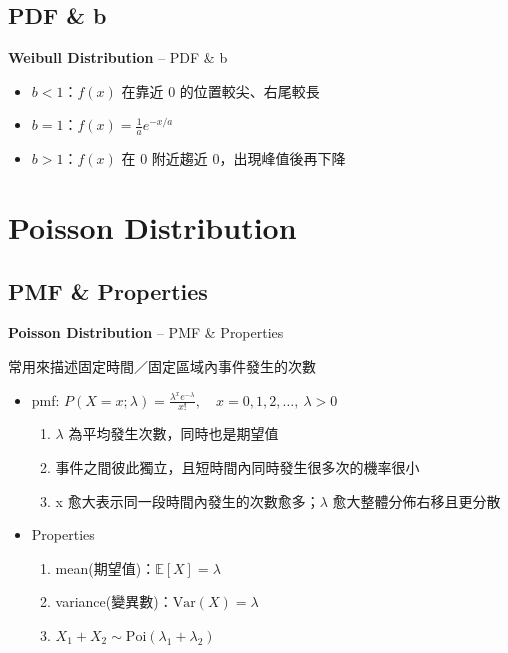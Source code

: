 \documentclass[12pt,aspectratio=43]{beamer}
\begin{document}
\subsection{PDF \& b}
\begin{frame}[t]{\textbf{Weibull Distribution} -- PDF \& b}
  \begin{itemize}
        \item $b<1$：$f(x)$ 在靠近 $0$ 的位置較尖、右尾較長
        \item $b=1$：$f(x)=\frac1a e^{-x/a}$
        \item $b>1$：$f(x)$ 在 $0$ 附近趨近 0，出現峰值後再下降
  \end{itemize}
\begin{figure}
\end{figure}
\end{frame}


\section{Poisson Distribution}
\subsection{PMF \& Properties}
\begin{frame}[t]{\textbf{Poisson Distribution} -- PMF \& Properties}
\linespread{1.5}

{\large 常用來描述固定時間／固定區域內事件發生的次數}
  \begin{itemize}
    \item pmf: $ P(X=x;\lambda)=\frac{\lambda^{x}e^{-\lambda}}{x!},\quad x=0,1,2,\ldots,\ \lambda>0 $
    \begin{enumerate}[]
      \item $\lambda$ 為平均發生次數，同時也是期望值
      \item 事件之間彼此獨立，且短時間內同時發生很多次的機率很小
      \item x 愈大表示同一段時間內發生的次數愈多；$\lambda$ 愈大整體分佈右移且更分散
    \end{enumerate}
    \item Properties
    \begin{enumerate}[]
      \item mean(期望值)：$ \mathbb{E}[X]=\lambda $
      \item variance(變異數)：$ \mathrm{Var}(X)=\lambda $
      \item $ X_1+X_2 \sim \mathrm{Poi}(\lambda_1+\lambda_2) $
    \end{enumerate}
  \end{itemize}

\end{frame}
\end{document}
